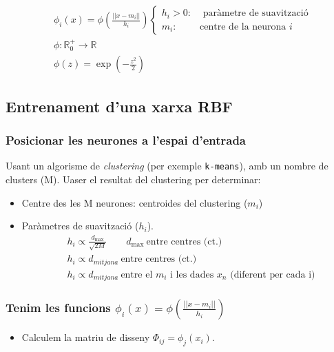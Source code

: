 \documentclass[a4paper]{article}
\begin{document}
\begin{align*}
& \phi_i (x) = \phi\left( \frac{||x - m_i||}{h_i} \right)
\begin{cases}
h_i > 0: &\text{ paràmetre de suavització} \\
m_i: &\text{centre de la neurona } i
\end{cases} \\
& \phi:\mathbb{R}_0^+ \rightarrow \mathbb{R} \\
& \phi(z) = \exp\left( - \frac{z^2}{2} \right)
\end{align*}

\begin{figure}[H]
	\centering
\end{figure}
\subsection{Entrenament d'una xarxa RBF}
\subsubsection{Posicionar les neurones a l'espai d'entrada}
Usant un algorisme de \emph{clustering} (per exemple \texttt{k-means}), amb un nombre de clusters (M). Uaser el resultat del clustering per determinar:
\begin{itemize}
	\item Centre des les M neurones: centroides del clustering ($m_i$)
	\item Paràmetres de suavització ($h_i$).
	\begin{align*}
		& h_i \propto \frac{d_{\max}}{\sqrt{2M}} \qquad d_{\max}\ \text{entre centres (ct.)} \\
		& h_i \propto d_{mitjana} \ \text{entre centres (ct.)} \\
		& h_i \propto d_{mitjana} \ \text{entre el $m_i$ i les dades $x_n$ (diferent per cada i)}
	\end{align*}
\end{itemize}

\subsubsection{Tenim les funcions $\phi_i (x) = \phi\left( \frac{||x - m_i||}{h_i} \right)$}
\begin{itemize}
	\item Calculem la matriu de disseny $\Phi_{ij} = \phi_j(x_i)$.
\end{itemize}
\end{document}
